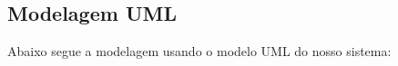 \documentclass{article}
\begin{document}
    \noindent

    \newpage
	\subsection{Modelagem UML}
	Abaixo segue a modelagem usando o modelo UML do nosso sistema:\\

    \noindent
\end{document}
